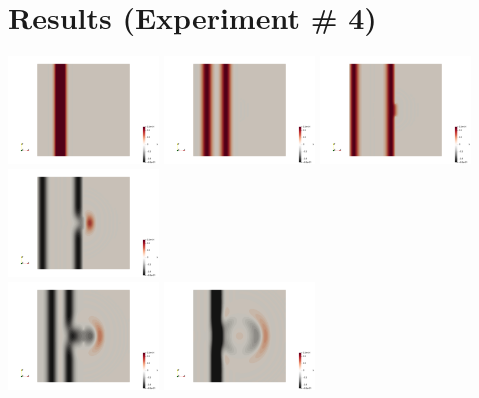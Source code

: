\section*{Results (Experiment \# 4)}

\begin{center}
\includegraphics[width=4cm]{python_codes/fieldstone_165/results4/uu0000.png}
\includegraphics[width=4cm]{python_codes/fieldstone_165/results4/uu0050.png}
\includegraphics[width=4cm]{python_codes/fieldstone_165/results4/uu0100.png}
\includegraphics[width=4cm]{python_codes/fieldstone_165/results4/uu0150.png}\\
\includegraphics[width=4cm]{python_codes/fieldstone_165/results4/uu0200.png}
\includegraphics[width=4cm]{python_codes/fieldstone_165/results4/uu0250.png}

\end{center}
